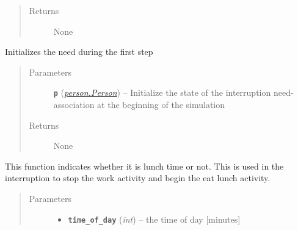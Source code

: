\documentclass[letterpaper,10pt,english]{sphinxmanual}
\begin{document}
\begin{fulllineitems}
\begin{fulllineitems}
\begin{quote}
\begin{description}
\item[{Returns}] \leavevmode
None

\end{description}\end{quote}

\end{fulllineitems}


\begin{fulllineitems}
\label{interruption:interruption.Interruption.get_time_to_next_work_lunch}
\end{fulllineitems}


\begin{fulllineitems}
\label{interruption:interruption.Interruption.initialize}
Initializes the need during the first step
\begin{quote}\begin{description}
\item[{Parameters}] \leavevmode
\textbf{\texttt{p}} ({\hyperref[person:person.Person]{\emph{\emph{person.Person}}}}) -- Initialize the state of the interruption need-association at the                          beginning of the simulation

\item[{Returns}] \leavevmode
None

\end{description}\end{quote}

\end{fulllineitems}


\begin{fulllineitems}
\label{interruption:interruption.Interruption.is_lunch_time}
This function indicates whether it is lunch time or not. This is used in the interruption to stop the work         activity and begin the eat lunch activity.
\begin{quote}\begin{description}
\item[{Parameters}] \leavevmode\begin{itemize}
\item {} 
\textbf{\texttt{time\_of\_day}} (\emph{int}) -- the time of day {[}minutes{]}


\end{itemize}
\end{description}
\end{quote}
\end{fulllineitems}
\end{fulllineitems}
\end{document}
